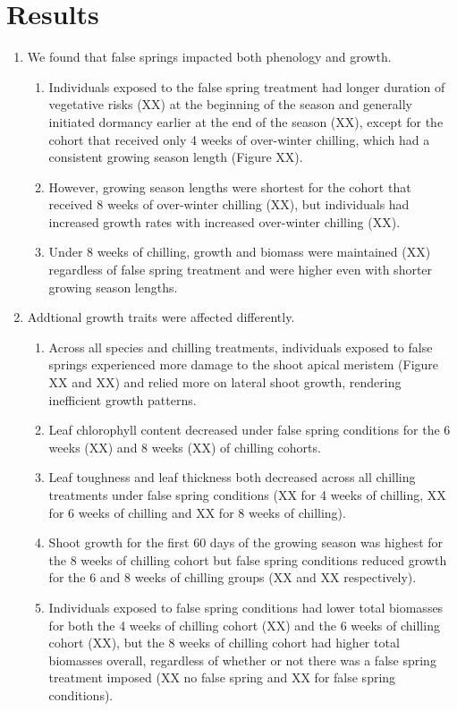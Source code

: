 \documentclass{article}\usepackage[]{graphicx}\usepackage[]{color}
\begin{document}
\section*{Results}
\begin{enumerate}
\item We found that false springs impacted both phenology and growth. 
  \begin{enumerate}
  \item Individuals exposed to the false spring treatment had longer duration of vegetative risks (XX) at the beginning of the season and generally initiated dormancy earlier at the end of the season (XX), except for the cohort that received only 4 weeks of over-winter chilling, which had a consistent growing season length (Figure XX). 
  \item However, growing season lengths were shortest for the cohort that received 8 weeks of over-winter chilling (XX), but individuals had increased growth rates with increased over-winter chilling (XX). 
  \item Under 8 weeks of chilling, growth and biomass were maintained (XX) regardless of false spring treatment and were higher even with shorter growing season lengths.
  \end{enumerate}
  
\item Addtional growth traits were affected differently.
  \begin{enumerate}
  \item Across all species and chilling treatments, individuals exposed to false springs experienced more damage to the shoot apical meristem (Figure XX and XX) and relied more on lateral shoot growth, rendering inefficient growth patterns. 
  \item Leaf chlorophyll content decreased under false spring conditions for the 6 weeks (XX) and 8 weeks (XX) of chilling cohorts.
  \item Leaf toughness and leaf thickness both decreased across all chilling treatments under false spring conditions (XX for 4 weeks of chilling, XX for 6 weeks of chilling and XX for 8 weeks of chilling).
  \item Shoot growth for the first 60 days of the growing season was highest for the 8 weeks of chilling cohort but false spring conditions reduced growth for the 6 and 8 weeks of chilling groups (XX and XX respectively).
  \item Individuals exposed to false spring conditions had lower total biomasses for both the 4 weeks of chilling cohort (XX) and the 6 weeks of chilling cohort (XX), but the 8 weeks of chilling cohort had higher total biomasses overall, regardless of whether or not there was a false spring treatment imposed (XX no false spring and XX for false spring conditions).
  \end{enumerate}
\end{enumerate}
\end{document}
